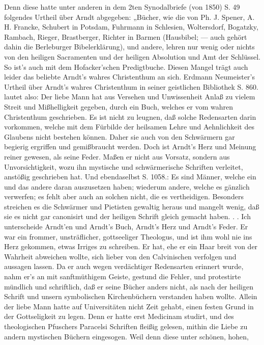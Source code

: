 Denn diese hatte unter anderen in dem 2ten Synodalbriefe (von 1850) S. 49 folgendes Urtheil über Arndt
abgegeben: „Bücher, wie die von Ph. J. Spener, A. H. Francke, Schubert in Potsdam, Fuhrmann in Schlesien,
Woltersdorf, Bogatzky, Rambach, Rieger, Brastberger, Richter in Barmen (Hausbibel; — auch gehört dahin die
Berleburger Bibelerklärung), und andere, lehren nur wenig oder nichts von den heiligen Sacramenten und der
heiligen Absolution und Amt der Schlüssel. So ist’s auch mit dem Hofacker’schen Predigtbuche. Diesen
Mangel trägt auch leider das beliebte Arndt’s wahres Christenthum an sich. Erdmann Neumeister’s Urtheil
über Arndt’s wahres Christenthum in seiner geistlichen Bibliothek S. 860. lautet also: Der liebe Mann hat
aus Versehen und Unwissenheit Anlaß zu vielem Streit und Mißhelligkeit gegeben, durch ein Buch, welches
er vom wahren Christenthum geschrieben. Es ist nicht zu leugnen, daß solche Redensarten darin vorkommen,
welche mit dem Fürbilde der heilsamen Lehre und Aehnlichkeit des Glaubens nicht bestehen können. Daher
sie auch von den Schwärmern gar begierig ergriffen und gemißbraucht werden. Doch ist Arndt’s Herz
und Meinung reiner gewesen, als seine Feder. Maßen er nicht aus Vorsatz, sondern aus Unvorsichtigkeit,
wozu ihn mystische und schwärmerische Schriften verleitet, anstößig geschrieben hat. Und ebendaselbst
S. 1058.: Es sind Männer, welche ein und das andere daran auszusetzen haben; wiederum andere, welche
es gänzlich verwerfen; es fehlt aber auch an solchen nicht, die es vertheidigen. Besonders streichen
es die Schwärmer und Pietisten gewaltig heraus und mangelt wenig, daß sie es nicht gar canonisirt und
der heiligen Schrift gleich gemacht haben. . . Ich unterscheide Arndt’en und Arndt’s Buch, Arndt’s
Herz und Arndt’s Feder. Er war ein frommer, unsträflicher, gottseeliger Theologus, und ist ihm wohl
nie ins Herz gekommen, etwas Irriges zu schreiben. Er hat, ehe er ein Haar breit von der
Wahrheit abweichen wollte, sich lieber von den Calvinischen verfolgen und aussagen
lassen. Da er auch wegen verdächtiger Redensarten erinnert wurde, nahm er’s an mit sanftmüthigem
Geiste, gestund die Fehler, und protestirte mündlich und schriftlich, daß er seine Bücher anders nicht,
als nach der heiligen Schrift und unsern symbolischen Kirchenbüchern verstanden haben wollte. Allein
der liebe Mann hatte auf Universitäten nicht Zeit gehabt, einen festen Grund in der Gottseligkeit zu
legen. Denn er hatte erst Medicinam studirt, und des theologischen Pfuschers Paracelsi Schriften fleißig
gelesen, mithin die Liebe zu andern mystischen Büchern eingesogen. Weil denn diese unter schönen, hohen,

